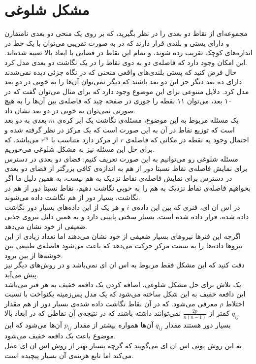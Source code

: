 \section{مشکل شلوغی}
مجموعه‌ای از نقاط دو بعدی را در نظر بگیرید، که بر روی یک منحی دو بعدی نامتقارن و دارای پستی و بلندی قرار دارند که در به صورت تقریبی می‌توان با یک خط در اندازه‌های کوچک تقریب زده شوند، و تمام این نقاط در فضایی با ابعاد بالا تعبیه شده‌اند.
این امکان وجود دارد که فاصله‌ی دو به دوی نقاط را در یک نگاشت دو بعدی مدل کرد.
\\
حال فرض کنید که پستی بلندی‌های واقعی منحنی که در نگاه جزئی دیده نمی‌شدند دارای ده بعد دیگر جز این دو بعد باشند که دیگر نمی‌توان آن‌ها را به خوبی در دو بعد مدل کرد. دلایل متنوعی برای این موضوع وجود دارد که برای مثال می‌توان گفت که در ۱۰ بعد، می‌توان ۱۱ نقطه را جوری در صفحه چید که فاصله‌ی بین آن‌ها را به هیچ صورتی نمی‌توان به خوبی در دو بعد نشان داد.
\\
یک مسئله مربوط به این موضوع، مسئله‌ی نگاشت یک ابر کره‌ی $m$ بعدی به دو بعد است که توزیع نقاط در آن به این صورت است که یک مرکز در نظر گرفته شده و احتمال وجود یه نقطه در مکانی که فاصله‌ی $r$ از مرکز دارد متناسب با $r^m$ می‌باشد، که برای حل این مسئله نیز به مشکل شلوغی می‌خوریم.
\\
مسئله شلوغی رو می‌توانیم به این صورت تعریف کنیم: فضای دو بعدی در دسترس برای نمایش فاصله‌ی نقاط نسبتا دور از هم به اندازه‌ی کافی بزرگتر از فضای دو بعدی در دسترس برای نمایش فاصله‌ی نقاط نزدیک به هم نیست، به همین دلیل ما اگر بخواهیم فاصله‌ی نقاط نزدیک به هم را به خوبی نگاشت دهیم، نقاط نسبتا دور از هم در نگاشت، بسیار دور از هم نگاشت داده می‌شوند.
\\
در اس ان ای، فنری که بین این داده‌ی $i$ و هر یک از این داده‌های بسیار دور نگاشت داده شده، قرار داده شده است، بسیار  سختی پایینی دارد و به همین دلیل نیروی جذبی ضعیفی از خود نشان می‌دهد.
\\
اگرچه این فنرها نیروهای بسیار ضعیفی از خود نشان می‌دهند اما تعداد زیادی از این نیرو‌ها داده‌ها را به سمت مرکز حرکت می‌دهد که باعث می‌شود فاصله‌ی طبیعی بین خوشه‌ها از بین برود.
\\
دقت کنید که این مشکل فقط مربوط به اس ان ای نمی‌باشد و در روش‌های دیگر نیز پیش می‌آید.
\\
یک تلاش برای حل مشکل شلوغی، اضافه کردن یک دافعه خفیف به هر فنر می‌باشد.
\\
این دافعه خفیف به این شکل ساخته می‌شود که یک مدل پس‌زمینه یکنواخت با نسبت اختلاط $\rho$ معرفی می‌شود. که در آن نقاط نگاشت داده شده‌ی بسیار دور از هم مقدار $q_{ij}$ کمتر از 
$\frac{2p}{n(n-1)}$
نمی‌توانند داشته باشند که در نتیجه‌ی آن نقاطی که در ابعاد بالا بسیار دور هستند مقدار $q_{ij}$ آن‌ها همواره بیشتر از مقدار $p_{ij}$ آن‌ها می‌شود که این موضوع باعث یک دافعه خفیف می‌شود.
\\
به این روش
{یونی اس ان ای}
می‌گویند که گرچه بسیار بهتر از روش اس ان ای عمل می‌کند اما تابع هزینه‌ی آن بسیار پیچیده است.
